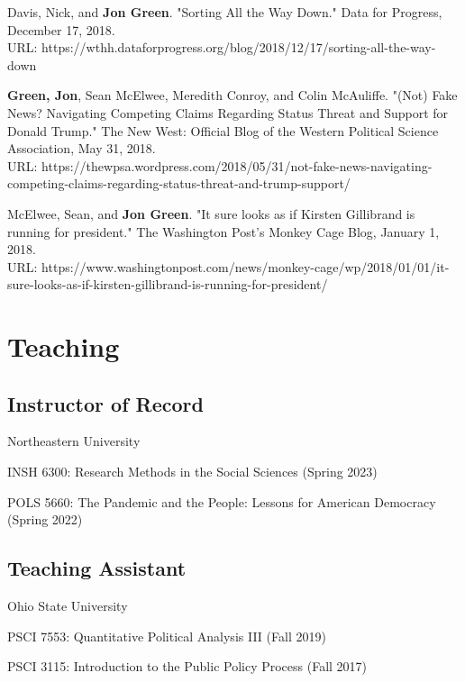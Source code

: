 \documentclass[letterpaper]{article}
\renewenvironment{itemize}{
  \begin{list}{}{
    \setlength{\leftmargin}{1.5em}
  }
}{
  \end{list}
}
\begin{document}
\begin{itemize}
\item Davis, Nick, and \textbf{Jon Green}. "Sorting All the Way Down." Data for Progress, December 17, 2018. \\
URL: https://wthh.dataforprogress.org/blog/2018/12/17/sorting-all-the-way-down

\item \textbf{Green, Jon}, Sean McElwee, Meredith Conroy, and Colin McAuliffe. "(Not) Fake News? Navigating Competing Claims Regarding Status Threat and Support for Donald Trump." The New West: Official Blog of the Western Political Science Association, May 31, 2018. \\
URL: https://thewpsa.wordpress.com/2018/05/31/not-fake-news-navigating-competing-claims-regarding-status-threat-and-trump-support/

\item McElwee, Sean, and \textbf{Jon Green}. "It sure looks as if Kirsten Gillibrand is running for president." The Washington Post's Monkey Cage Blog, January 1, 2018. \\ 
URL: https://www.washingtonpost.com/news/monkey-cage/wp/2018/01/01/it-sure-looks-as-if-kirsten-gillibrand-is-running-for-president/
\end{itemize}

\section*{Teaching}

\subsection*{Instructor of Record}

\begin{itemize}
\item Northeastern University 
\begin{itemize}
\item INSH 6300: Research Methods in the Social Sciences (Spring 2023)
\item POLS 5660: The Pandemic and the People: Lessons for American Democracy (Spring 2022)
\end{itemize}
\end{itemize}

\subsection*{Teaching Assistant}

\begin{itemize}
\item Ohio State University 
\begin{itemize}
\item PSCI 7553: Quantitative Political Analysis III (Fall 2019)
\item PSCI 3115: Introduction to the Public Policy Process (Fall 2017)
\end{itemize}
\end{itemize}
\end{document}
